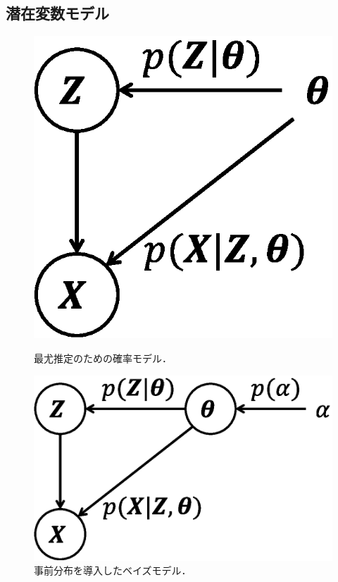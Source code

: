 \subsection{潜在変数モデル}

\begin{figure}[t]
\centering
\begin{minipage}{.355\linewidth}
\centering
\includegraphics[width=.99\linewidth]{sections/optimization/model_ml}
\caption{最尤推定のための確率モデル．}
\label{fig:model_ml}
\end{minipage}
\hspace{6pt}
\begin{minipage}{.56\linewidth}
\centering
\includegraphics[width=.99\linewidth]{sections/optimization/model_bayes}
\caption{事前分布を導入したベイズモデル．}
\label{fig:model_bayes}
\end{minipage}
\end{figure}


